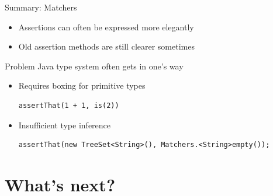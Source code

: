 \begin{frame}[fragile]{Summary: Matchers}
	\begin{itemize}
		\item Assertions can often be expressed more elegantly
		\item Old assertion methods are still clearer sometimes
	\end{itemize}
	\begin{block}{Problem}
		Java type system often gets in one's way
		\begin{itemize}
			\item Requires boxing for primitive types \begin{lstlisting}
assertThat(1 + 1, is(2))
\end{lstlisting}
			\item Insufficient type inference \begin{lstlisting}
assertThat(new TreeSet<String>(), Matchers.<String>empty());
\end{lstlisting}
		\end{itemize}
	\end{block}
\end{frame}


{
\date{Quint Buchholz, Mann auf einer Leiter}
\part{What's next?}
}

